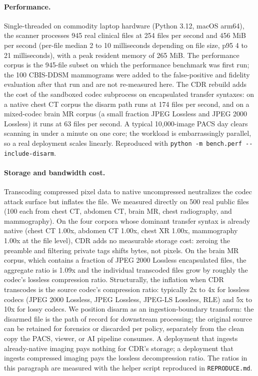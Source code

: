 \documentclass[11pt]{article}
\begin{document}
\paragraph{Performance.} Single-threaded on commodity laptop hardware (Python 3.12, macOS arm64), the scanner processes 945 real clinical files at 254 files per second and 456 MiB per second (per-file median 2 to 10 milliseconds depending on file size, p95 4 to 21 milliseconds), with a peak resident memory of 265 MiB. The performance corpus is the 945-file subset on which the performance benchmark was first run; the 100 CBIS-DDSM mammograms were added to the false-positive and fidelity evaluation after that run and are not re-measured here. The CDR rebuild adds the cost of the sandboxed codec subprocess on encapsulated transfer syntaxes: on a native chest CT corpus the disarm path runs at 174 files per second, and on a mixed-codec brain MR corpus (a small fraction JPEG Lossless and JPEG 2000 Lossless) it runs at 63 files per second. A typical 10,000-image PACS day clears scanning in under a minute on one core; the workload is embarrassingly parallel, so a real deployment scales linearly. Reproduced with \verb|python -m bench.perf --include-disarm|.

\paragraph{Storage and bandwidth cost.} Transcoding compressed pixel data to native uncompressed neutralizes the codec attack surface but inflates the file. We measured directly on 500 real public files (100 each from chest CT, abdomen CT, brain MR, chest radiography, and mammography). On the four corpora whose dominant transfer syntax is already native (chest CT 1.00x, abdomen CT 1.00x, chest XR 1.00x, mammography 1.00x at the file level), CDR adds no measurable storage cost: zeroing the preamble and filtering private tags shifts bytes, not pixels. On the brain MR corpus, which contains a fraction of JPEG 2000 Lossless encapsulated files, the aggregate ratio is 1.09x and the individual transcoded files grow by roughly the codec's lossless compression ratio. Structurally, the inflation when CDR transcodes is the source codec's compression ratio: typically 2x to 4x for lossless codecs (JPEG 2000 Lossless, JPEG Lossless, JPEG-LS Lossless, RLE) and 5x to 10x for lossy codecs. We position disarm as an ingestion-boundary transform: the disarmed file is the path of record for downstream processing; the original source can be retained for forensics or discarded per policy, separately from the clean copy the PACS, viewer, or AI pipeline consumes. A deployment that ingests already-native imaging pays nothing for CDR's storage; a deployment that ingests compressed imaging pays the lossless decompression ratio. The ratios in this paragraph are measured with the helper script reproduced in \texttt{REPRODUCE.md}.
\end{document}
